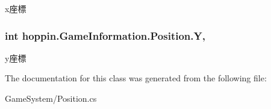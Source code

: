 x座標 

\subsubsection[{\texorpdfstring{Y}{Y}}]{\setlength{\rightskip}{0pt plus 5cm}int hoppin.\+Game\+Information.\+Position.\+Y\hspace{0.3cm}{\ttfamily [get]}, {\ttfamily [set]}}\hypertarget{classhoppin_1_1_game_information_1_1_position_ac52b4c69bb31a57dadcb9ecf69608150}{}\label{classhoppin_1_1_game_information_1_1_position_ac52b4c69bb31a57dadcb9ecf69608150}


y座標 



The documentation for this class was generated from the following file\+:\begin{DoxyCompactItemize}
\item 
Game\+System/Position.\+cs\end{DoxyCompactItemize}
